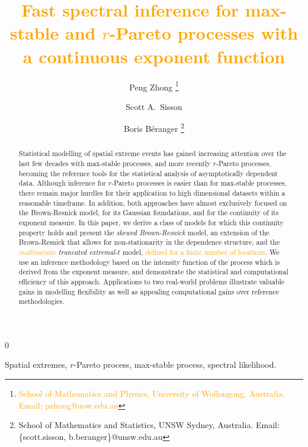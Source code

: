 \documentclass[12pt]{article}
\newcommand{\blind}{0}
\newcommand{\PZ}{\textcolor{orange}}
\newcommand{\symfoot}[2]{%
  \begingroup
  \renewcommand{\thefootnote}{\fnsymbol{footnote}}%
  \setcounter{footnote}{#1}%
  \footnote{#2}%
  \endgroup
}
\newcommand{\symfootmark}[1]{%
  \begingroup
  \renewcommand{\thefootnote}{\fnsymbol{footnote}}%
  \setcounter{footnote}{#1}%
  \footnotemark%
  \endgroup
}
\begin{document}
\title{\bf \PZ{Fast spectral inference for max-stable and $r$-Pareto processes with a continuous exponent function}}
\blind{
  \author{Peng Zhong\symfoot{1}{\PZ{School of Mathematics and Physics, University of Wollongong, Australia. Email: pzhong@uow.edu.au}}
  \and Scott A.~Sisson\symfootmark{2}
  \and Boris B\'{e}ranger\symfoot{2}{School of Mathematics and Statistics, UNSW Sydney, Australia. Email: \{scott.sisson, b.beranger\}@unsw.edu.au}}
  \maketitle
} \fi

\vspace{-8mm}
\baselineskip=25pt
\begin{abstract}
    Statistical modelling of spatial extreme events has gained increasing attention over the last few decades with max-stable processes, and more recently $r$-Pareto processes, becoming the reference tools for the statistical analysis of asymptotically dependent data. Although inference for $r$-Pareto processes is easier than for max-stable processes, there remain major hurdles for their application to high dimensional datasets within a reasonable timeframe. In addition, both approaches have almost exclusively focused on the Brown-Resnick model, for its Gaussian foundations, and for the continuity of its exponent measure. In this paper, we derive a class of models for which this continuity property holds and present the \emph{skewed Brown-Resnick} model, an extension of the Brown-Resnick that allows for non-stationarity in the dependence structure, and the \emph{\PZ{multivariate} truncated extremal-$t$} model, \PZ{defined for a finite number of locations}.
    We use an inference methodology based on the intensity function of the process which is derived from the exponent measure, and demonstrate the statistical and computational efficiency of this approach. Applications to two real-world problems illustrate valuable gains in modelling flexibility as well as appealing computational gains over reference methodologies. 
\end{abstract}

  Spatial extremes, $r$-Pareto process, max-stable process, spectral likelihood.
\end{document}
